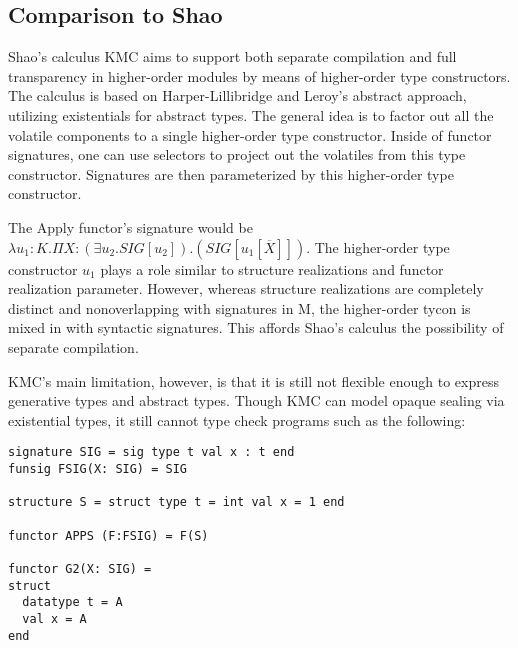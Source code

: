 \subsection{Comparison to Shao}
Shao's calculus KMC aims to support both separate compilation and full transparency in higher-order modules by means of higher-order type constructors. The calculus is based on Harper-Lillibridge and Leroy's abstract approach, utilizing existentials for abstract types. The general idea is to factor out all the volatile components to a single higher-order type constructor. Inside of functor signatures, one can use selectors to project out the volatiles from this type constructor. Signatures are then parameterized by this higher-order type constructor. 

The Apply functor's signature would be $\lambda u_1:K.\Pi X:(\exists u_2.SIG[u_2]).(SIG[u_1[\overline{X}]])$. The higher-order type constructor $u_1$ plays a role similar to structure realizations and functor realization parameter. However, whereas structure realizations are completely distinct and nonoverlapping with signatures in M, the higher-order tycon is mixed in with syntactic signatures. This affords Shao's calculus the possibility of separate compilation.  

KMC's main limitation, however, is that it is still not flexible enough to express generative types and abstract types. Though KMC can model opaque sealing via existential types, it still cannot type check programs such as the following:

\begin{lstlisting}
signature SIG = sig type t val x : t end
funsig FSIG(X: SIG) = SIG

structure S = struct type t = int val x = 1 end

functor APPS (F:FSIG) = F(S)

functor G2(X: SIG) = 
struct 
  datatype t = A 
  val x = A
end
\end{lstlisting}

